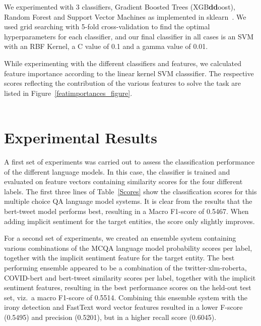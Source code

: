 \documentclass[11pt]{article}
\begin{document}
We experimented with 3 classifiers, Gradient Boosted Trees (XGB\textbf{dd}oost), Random Forest and Support Vector Machines as implemented in sklearn~\cite{scikit-learn}.  We used grid searching with 5-fold cross-validation to find the optimal hyperparameters for each classifier, and our final classifier in all cases is an SVM with an RBF Kernel, a C value of 0.1 and a gamma value of 0.01.

While experimenting with the different classifiers and features, we calculated feature importance according to the linear kernel SVM classsifier. The respective scores reflecting the contribution of the various features to solve the task are listed in Figure~\ref{featimportances_figure}.
\\
\\
\section{Experimental Results}

A first set of experiments was carried out to assess the classification performance of the different language models. 
In this case, the classifier is trained and evaluated on feature vectors containing similarity scores for the four different labels. The first three lines of Table~\ref{Scores} show the classification scores for this multiple choice QA language model systems. 
It is clear from the results that the bert-tweet model performs best, resulting in a Macro F1-score of 0.5467. When adding implicit sentiment for the target entities, the score only slightly improves.

For a second set of experiments, we created an ensemble system containing various combinations of the MCQA language model probability scores per label, together with the implicit sentiment feature for the target entity. The best performing ensemble appeared to be a combination of the twitter-xlm-roberta, COVID-bert and bert-tweet similarity scores per label, together with the implicit sentiment features, resulting in the best performance scores on the held-out test set, viz.~a macro F1-score of 0.5514.
Combining this ensemble system with the irony detection and FastText word vector features resulted in a lower F-score (0.5495) and precision (0.5201), but in a higher recall score (0.6045).
\end{document}
